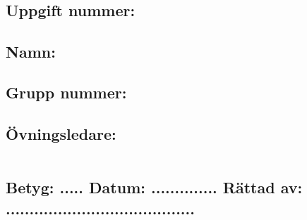 %

%

\thispagestyle{empty}
\section*{\course \ \coursename}

\vspace{10mm}

\subsection*{Uppgift nummer: \texttt{\textmd{\homeworknumber}}}

\vspace{3mm}

\subsection*{Namn: \texttt{\textmd{\theauthor}}}

\vspace{3mm}

\subsection*{Grupp nummer: \texttt{\textmd{\coursegroup}}}

\vspace{3mm}

\subsection*{Övningsledare: \texttt{\textmd{\courceleader}}}


\vspace{10mm}

\begin{tabular}{l}
 \hspace{140mm} \\
\hline \hline
\end{tabular}

\vspace{5mm}

\subsection*{Betyg: ..... \hspace{2mm}  Datum: .............. \hspace{2mm} Rättad av: ........................................}


%
